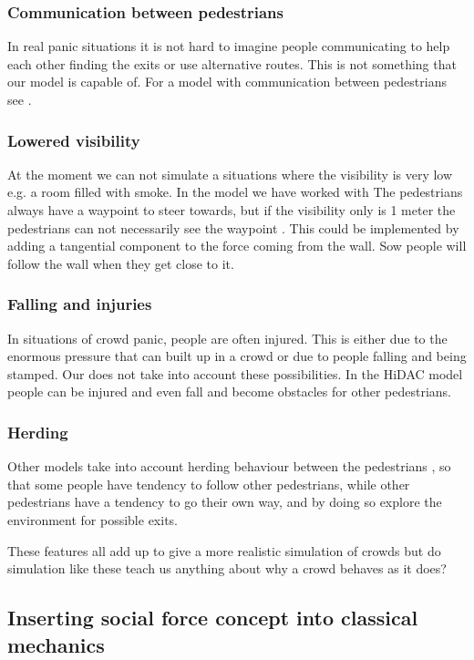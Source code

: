 \subsubsection{Communication between pedestrians}
In real panic situations it is not hard to imagine people communicating to help each other finding the exits or use alternative routes. This is 
not something that our model is capable of. For a model with communication between 
pedestrians see \cite{HiDAC}.

\subsubsection{Lowered visibility}
At the moment we can not simulate a situations where the visibility is very low 
e.g. a room filled with smoke. In the model we have worked with The pedestrians always 
have a waypoint to steer towards, but if the visibility only is 1 meter the 
pedestrians can not necessarily see the waypoint \cite{HelbingNew}. This could be implemented by adding a tangential component to the force coming from the wall. Sow people will follow the wall when they get close to it.

\subsubsection{Falling and injuries}
In situations of crowd panic, people are often injured. This is either due to the 
enormous pressure that can built up in a crowd or due to people falling and being stamped. Our 
does not take into account these possibilities. In the HiDAC model people can 
be injured and even fall and become obstacles for other pedestrians.\cite{HiDAC}

\subsubsection{Herding}
Other models take into account herding behaviour between the pedestrians \cite{helbing00}, so that some people have tendency to follow other pedestrians, while other pedestrians have a tendency to go their own way,  and by doing so explore the environment for possible exits.

These features all add up to give a more realistic simulation of crowds but do simulation like these teach us anything about why a crowd behaves 
as it does?

\subsection{Inserting social force concept into classical mechanics}
\label{subsec:development}

